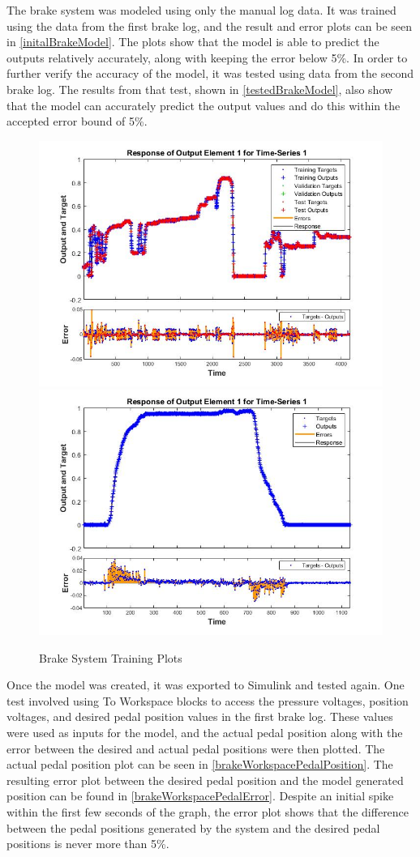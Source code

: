 \documentclass[journal,twoside,web]{ieeecolor}
\begin{document}
The brake system was modeled using only the manual log data. It was trained using the data from the first brake log, and the result and error plots can be seen in \autoref{initalBrakeModel}. The plots show that the model is able to predict the outputs relatively accurately, along with keeping the error below 5\%. In order to further verify the accuracy of the model, it was tested using data from the second brake log. The results from that test, shown in \autoref{testedBrakeModel}, also show that the model can accurately predict the output values and do this within the accepted error bound of 5\%.
\begin{figure}[h]
	\centering
		{\includegraphics[width=0.48\linewidth]{figs/img/brake_new_neuralNetworkFig}}
		{\includegraphics[width=0.48\linewidth]{figs/img/brake_new_neuralNetworkFigLog2Test}}
	\caption{Brake System Training Plots}
\end{figure}

Once the model was created, it was exported to Simulink and tested again. One test involved using To Workspace blocks to access the pressure voltages, position voltages, and desired pedal position values in the first brake log. These values were used as inputs for the model, and the actual pedal position along with the error between the desired and actual pedal positions were then plotted. The actual pedal position plot can be seen in \autoref{brakeWorkspacePedalPosition}. The resulting error plot between the desired pedal position and the model generated position can be found in \autoref{brakeWorkspacePedalError}. Despite an initial spike within the first few seconds of the graph, the error plot shows that the difference between the pedal positions generated by the system and the desired pedal positions is never more than 5\%. 
\end{document}
